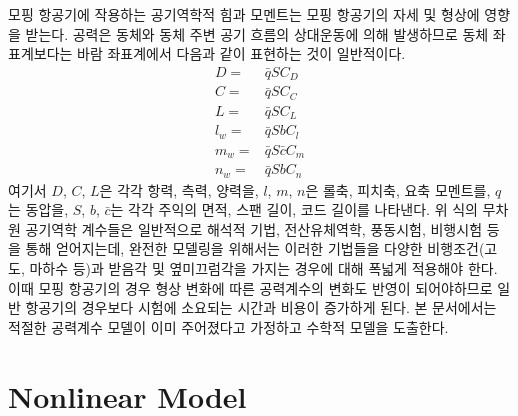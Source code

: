 \documentclass[a4paper, 12pt]{report}
\begin{document}
	모핑 항공기에 작용하는 공기역학적 힘과 모멘트는 모핑 항공기의 자세 및 형상에 영향을 받는다.
	공력은 동체와 동체 주변 공기 흐름의 상대운동에 의해 발생하므로 동체 좌표계보다는 바람 좌표계에서 다음과 같이 표현하는 것이 일반적이다.
	\begin{align}
		D =& \bar{q}SC_D \\
		C =& \bar{q}SC_C \\
		L =& \bar{q}SC_L \\
		l_w =& \bar{q}SbC_l \\
		m_w =& \bar{q}S\bar{c}C_m \\
		n_w =& \bar{q}SbC_n
	\end{align}
	여기서 $D$, $C$, $L$은 각각 항력, 측력, 양력을, $l$, $m$, $n$은 롤축, 피치축, 요축 모멘트를, $q$는 동압을, $S$, $b$, $\bar{c}$는 각각 주익의 면적, 스팬 길이, 코드 길이를 나타낸다.
	위 식의 무차원 공기역학 계수들은 일반적으로 해석적 기법, 전산유체역학, 풍동시험, 비행시험 등을 통해 얻어지는데, 완전한 모델링을 위해서는 이러한 기법들을 다양한 비행조건(고도, 마하수 등)과 받음각 및 옆미끄럼각을 가지는 경우에 대해 폭넓게 적용해야 한다.
	이때 모핑 항공기의 경우 형상 변화에 따른 공력계수의 변화도 반영이 되어야하므로 일반 항공기의 경우보다 시험에 소요되는 시간과 비용이 증가하게 된다.
	본 문서에서는 적절한 공력계수 모델이 이미 주어졌다고 가정하고 수학적 모델을 도출한다.
	
	\section{Nonlinear Model}
	
\end{document}
